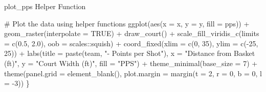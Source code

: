 \documentclass[
  9pt,
  ignorenonframetext,
  aspectratio=169]{beamer}
\newenvironment{Shaded}{\begin{snugshade}}{\end{snugshade}}
\newcommand{\AttributeTok}[1]{\textcolor[rgb]{0.00,0.34,0.68}{#1}}
\newcommand{\CommentTok}[1]{\textcolor[rgb]{0.54,0.53,0.53}{#1}}
\newcommand{\ConstantTok}[1]{\textcolor[rgb]{0.67,0.33,0.00}{#1}}
\newcommand{\DecValTok}[1]{\textcolor[rgb]{0.69,0.50,0.00}{#1}}
\newcommand{\FloatTok}[1]{\textcolor[rgb]{0.69,0.50,0.00}{#1}}
\newcommand{\FunctionTok}[1]{\textcolor[rgb]{0.39,0.29,0.61}{#1}}
\newcommand{\NormalTok}[1]{\textcolor[rgb]{0.12,0.11,0.11}{#1}}
\newcommand{\SpecialCharTok}[1]{\textcolor[rgb]{0.24,0.68,0.91}{#1}}
\newcommand{\StringTok}[1]{\textcolor[rgb]{0.75,0.01,0.01}{#1}}
\begin{document}
\begin{frame}[fragile]{plot\_pps Helper Function}
\begin{Shaded}
\begin{Highlighting}[]
    \CommentTok{\# Plot the data using helper functions}
    \FunctionTok{ggplot}\NormalTok{(}\FunctionTok{aes}\NormalTok{(}\AttributeTok{x =}\NormalTok{ x, }\AttributeTok{y =}\NormalTok{ y, }\AttributeTok{fill =}\NormalTok{ pps)) }\SpecialCharTok{+}
    \FunctionTok{geom\_raster}\NormalTok{(}\AttributeTok{interpolate =} \ConstantTok{TRUE}\NormalTok{) }\SpecialCharTok{+}
    \FunctionTok{draw\_court}\NormalTok{() }\SpecialCharTok{+}
    \FunctionTok{scale\_fill\_viridis\_c}\NormalTok{(}\AttributeTok{limits =} \FunctionTok{c}\NormalTok{(}\FloatTok{0.5}\NormalTok{, }\FloatTok{2.0}\NormalTok{), }\AttributeTok{oob =}\NormalTok{ scales}\SpecialCharTok{::}\NormalTok{squish) }\SpecialCharTok{+}
    \FunctionTok{coord\_fixed}\NormalTok{(}\AttributeTok{xlim =} \FunctionTok{c}\NormalTok{(}\DecValTok{0}\NormalTok{, }\DecValTok{35}\NormalTok{), }\AttributeTok{ylim =} \FunctionTok{c}\NormalTok{(}\SpecialCharTok{{-}}\DecValTok{25}\NormalTok{, }\DecValTok{25}\NormalTok{)) }\SpecialCharTok{+}
    \FunctionTok{labs}\NormalTok{(}\AttributeTok{title =} \FunctionTok{paste}\NormalTok{(team, }\StringTok{"{-} Points per Shot"}\NormalTok{),}
         \AttributeTok{x =} \StringTok{"Distance from Basket (ft)"}\NormalTok{,}
         \AttributeTok{y =} \StringTok{"Court Width (ft)"}\NormalTok{,}
         \AttributeTok{fill =} \StringTok{"PPS"}\NormalTok{) }\SpecialCharTok{+}
    \FunctionTok{theme\_minimal}\NormalTok{(}\AttributeTok{base\_size =} \DecValTok{7}\NormalTok{) }\SpecialCharTok{+}
    \FunctionTok{theme}\NormalTok{(}\AttributeTok{panel.grid =} \FunctionTok{element\_blank}\NormalTok{(), }\AttributeTok{plot.margin =} \FunctionTok{margin}\NormalTok{(}\AttributeTok{t =} \DecValTok{2}\NormalTok{, }\AttributeTok{r =} \DecValTok{0}\NormalTok{, }\AttributeTok{b =} \DecValTok{0}\NormalTok{, }\AttributeTok{l =} \SpecialCharTok{{-}}\DecValTok{3}\NormalTok{))}
\NormalTok{\}}
\end{Highlighting}
\end{Shaded}
\end{frame}
\end{document}
